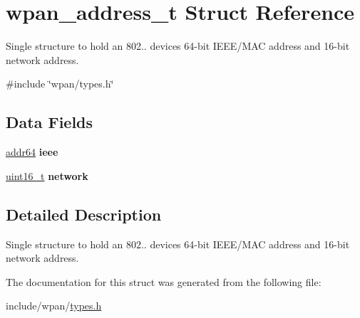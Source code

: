 \hypertarget{structwpan__address__t}{}\section{wpan\+\_\+address\+\_\+t Struct Reference}
\label{structwpan__address__t}


Single structure to hold an 802.. device\textquotesingle{}s 64-\/bit I\+E\+E\+E/\+M\+AC address and 16-\/bit network address.  




{\ttfamily \#include \char`\"{}wpan/types.\+h\char`\"{}}

\subsection*{Data Fields}
\begin{DoxyCompactItemize}
\item 
\hyperlink{unionaddr64}{addr64} {\bfseries ieee}
\item 
\hyperlink{group__hal__dos_ga5a8b2dc9e45a9ee81a94ef304fb62505}{uint16\+\_\+t} {\bfseries network}
\end{DoxyCompactItemize}


\subsection{Detailed Description}
Single structure to hold an 802.. device\textquotesingle{}s 64-\/bit I\+E\+E\+E/\+M\+AC address and 16-\/bit network address. 



The documentation for this struct was generated from the following file\+:\begin{DoxyCompactItemize}
\item 
include/wpan/\hyperlink{types_8h}{types.\+h}\end{DoxyCompactItemize}

